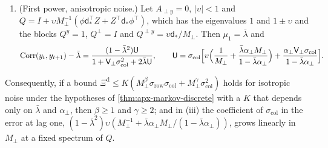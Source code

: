 \begin{proposition}
\begin{enumerate}
\begin{equation}\label{eq:apx-markov-nonnormal-tilt}
\lim_{\sigma_{\mathrm{col}}\to0}\frac{\Corr(y_t,y_{t+1})-\mu_1}{\sigma_{\mathrm{col}}\sigma_{\mathrm{row}}}=-(1-\bar\lambda^2)\Bigl[M_\perp\Bigl(\frac1{(\bar\lambda-\alpha_\perp)(1-\bar\lambda\alpha_\perp)}-\frac1{\bar\lambda}\Bigr)+\frac1{\bar\lambda M_\perp}\Bigr],
\end{equation}
in which the coefficient of $M_\perp$ is positive.
\item[(iii)] (First power, anisotropic noise.) Let $A_{\perp y}=0$, $\lvert\upsilon\rvert<1$ and $Q=I+\upsilon M_\perp^{-1}(\phi\mathsf d_\ast^\top Z+Z^\top\mathsf d_\ast\phi^\top)$, which has the eigenvalues $1$ and $1\pm\upsilon$ and the blocks $Q^y=1$, $Q^\perp=I$ and $Q^{\perp y}=\upsilon\mathsf d_\ast/M_\perp$. Then $\mu_1=\bar\lambda$ and
\begin{equation}\label{eq:apx-markov-nonnormal-noise}
\operatorname{Corr}(y_t,y_{t+1})-\bar\lambda=\frac{(1-\bar\lambda^2)\mathsf U}{1+\mathsf V_\perp\sigma_{\mathrm{col}}^2+2\bar\lambda\mathsf U},\qquad\mathsf U=\sigma_{\mathrm{col}}\Bigl[\upsilon\Bigl(\frac1{M_\perp}+\frac{\bar\lambda\alpha_\perp M_\perp}{1-\bar\lambda\alpha_\perp}\Bigr)+\frac{\alpha_\perp\mathsf V_\perp\sigma_{\mathrm{col}}}{1-\bar\lambda\alpha_\perp}\Bigr].
\end{equation}
\end{enumerate}
Consequently, if a bound $\Xi^{\mathrm d}\le K(M_\perp^\beta\sigma_{\mathrm{row}}\sigma_{\mathrm{col}}+M_\perp^\gamma\sigma_{\mathrm{col}}^2)$ holds for isotropic noise under the hypotheses of \cref{thm:apx-markov-discrete} with a $K$ that depends only on $\bar\lambda$ and $\alpha_\perp$, then $\beta\ge1$ and $\gamma\ge2$; and in (iii) the coefficient of $\sigma_{\mathrm{col}}$ in the error at lag one, $(1-\bar\lambda^2)\upsilon(M_\perp^{-1}+\bar\lambda\alpha_\perp M_\perp/(1-\bar\lambda\alpha_\perp))$, grows linearly in $M_\perp$ at a fixed spectrum of $Q$.
\end{proposition}

